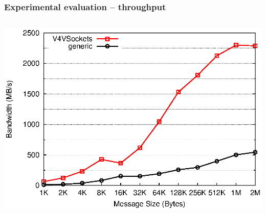 \documentclass[red,slidestop,notes,compress,mathserif]{beamer}
\begin{document}
\begin{frame}
\frametitle{Experimental evaluation -- throughput}
\begin{columns}
\includegraphics[width=\textwidth]{figures/v4v_bw.eps}
\end{columns}
\end{frame}

\end{document}
